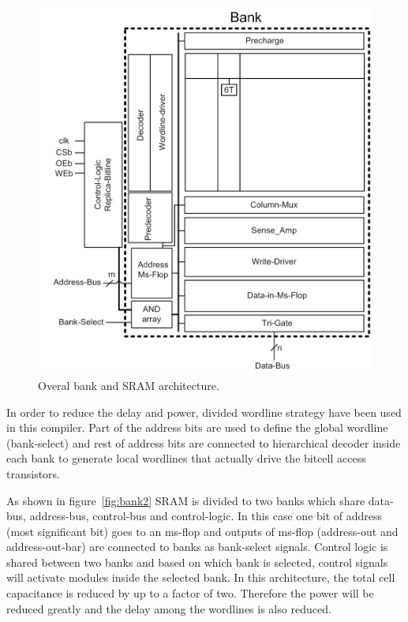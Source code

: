 \begin{figure}[h!]
\centering
\includegraphics[scale=1]{./figs/bank.pdf}
\caption{Overal bank and SRAM architecture.}
\label{fig:bank}
\end{figure}


In order to reduce the delay and power, divided wordline strategy have been used in this compiler. Part of the address bits 
are used to define the global wordline (bank-select) and rest of address bits are connected to hierarchical 
decoder inside each bank to generate local wordlines that actually drive the bitcell access transistors. 

As shown in figure~\ref{fig:bank2} SRAM is divided to two banks which share data-bus, address-bus, control-bus and control-logic. 
In this case one bit of address (most significant bit) goes to an ms-flop and outputs of ms-flop (address-out and address-out-bar) 
are connected to banks as bank-select signals. Control logic is shared between two banks and based on which bank is selected, 
control signals will activate modules inside the selected bank. In this architecture, the total cell capacitance is reduced by up 
to a factor of two. Therefore the power will be reduced greatly and the delay among the wordlines is also reduced.


